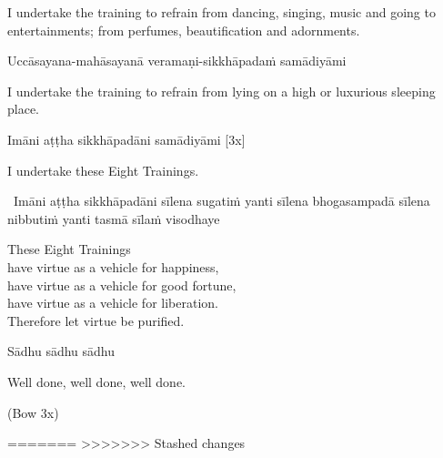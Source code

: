 \begin{english-hang}
  I undertake the training to refrain from dancing, singing, music and going to entertainments; from perfumes, beautification and adornments.\makeatletter\hyperlink{endnote143-appendix}\makeatother
\end{english-hang}

Uccāsayana-mahāsayanā veramaṇi-sikkhāpadaṁ samādiyāmi

\begin{english-hang}
  I undertake the training to refrain from lying on a high or luxurious sleeping place.
\end{english-hang}

Imāni aṭṭha sikkhāpadāni samādiyāmi \hfill{[3x]}

\begin{english}
  I undertake these Eight Trainings.
\end{english}

\begin{leader-only}
  \anglebracketleft\ \hspace{-0.5mm}Imāni aṭṭha sikkhāpadāni sīlena sugatiṁ yanti sīlena bhogasampadā sīlena nibbutiṁ yanti tasmā sīlaṁ visodhaye \hspace{-0.5mm}\anglebracketright\
\end{leader-only}

\begin{english-verses}
  These Eight Trainings\\
  have virtue as a vehicle for happiness,\\
  have virtue as a vehicle for good fortune,\\
  have virtue as a vehicle for liberation.\\
  Therefore let virtue be purified.\makeatletter\hyperlink{endnote144-appendix}\makeatother
\end{english-verses}

Sādhu sādhu sādhu

\begin{english}
  Well done, well done, well done.
\end{english}

\begin{center}
  (Bow 3x)
\end{center}

\clearpage
=======
>>>>>>> Stashed changes
